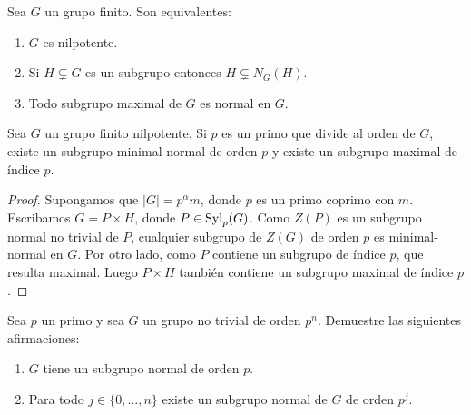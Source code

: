 \begin{exercise}
	\label{exercise:normalizadora}
	Sea $G$ un grupo finito. Son equivalentes:
	\begin{enumerate}
		\item $G$ es nilpotente.
		\item Si $H\subsetneq G$ es un subgrupo entonces $H\subsetneq N_G(H)$.
		\item Todo subgrupo maximal de $G$ es normal en $G$.
	\end{enumerate}
\end{exercise}



\begin{theorem}
	Sea $G$ un grupo finito nilpotente. Si $p$ es un primo que divide al orden
	de $G$, existe un subgrupo minimal-normal de orden $p$ y existe un subgrupo
	maximal de índice $p$.
\end{theorem}

\begin{proof}
	Supongamos que $|G|=p^{\alpha}m$, donde $p$ es un primo coprimo con $m$.
	Escribamos $G=P\times H$, donde $P\in\mathrm{Syl}_p(G)$.  Como $Z(P)$ es un
	subgrupo normal no trivial de $P$, cualquier subgrupo de $Z(G)$ de orden
	$p$ es minimal-normal en $G$. Por otro lado, como $P$ contiene un subgrupo
	de índice $p$, que resulta maximal. Luego $P\times H$ también contiene un
	subgrupo maximal de índice $p$.
\end{proof}

\begin{exercise}
	\label{exercise:pgrupos}
	Sea $p$ un primo y sea $G$ un grupo no trivial de orden $p^n$.
	Demuestre las siguientes afirmaciones:
	\begin{enumerate}
		\item $G$ tiene un subgrupo normal de orden $p$.
		\item Para todo $j\in\{0,\dots,n\}$ existe un subgrupo normal de
			$G$ de orden $p^j$. 
	\end{enumerate}
\end{exercise}

